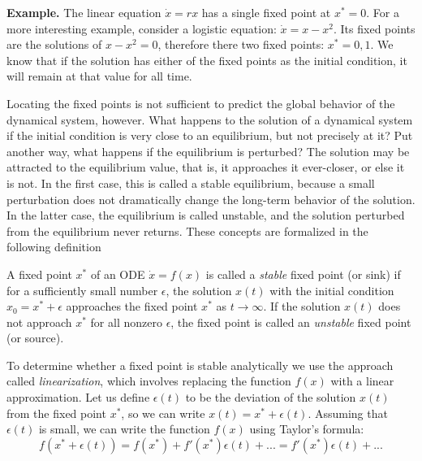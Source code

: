 \documentclass[
  letterpaper,
  DIV=11,
  numbers=noendperiod]{scrreprt}
\begin{document}
\textbf{Example.} The linear equation \(\dot x = rx\) has a single fixed
point at \(x^* = 0\). For a more interesting example, consider a
logistic equation: \(\dot x = x - x^2\). Its fixed points are the
solutions of \(x - x^2 = 0\), therefore there two fixed points:
\(x^* = 0, 1\). We know that if the solution has either of the fixed
points as the initial condition, it will remain at that value for all
time.

Locating the fixed points is not sufficient to predict the global
behavior of the dynamical system, however. What happens to the solution
of a dynamical system if the initial condition is very close to an
equilibrium, but not precisely at it? Put another way, what happens if
the equilibrium is perturbed? The solution may be attracted to the
equilibrium value, that is, it approaches it ever-closer, or else it is
not. In the first case, this is called a stable equilibrium, because a
small perturbation does not dramatically change the long-term behavior
of the solution. In the latter case, the equilibrium is called unstable,
and the solution perturbed from the equilibrium never returns. These
concepts are formalized in the following definition

\begin{tcolorbox}[enhanced jigsaw, coltitle=black, arc=.35mm, opacitybacktitle=0.6, breakable, bottomtitle=1mm, toptitle=1mm, titlerule=0mm, colback=white, leftrule=.75mm, rightrule=.15mm, colframe=quarto-callout-note-color-frame, colbacktitle=quarto-callout-note-color!10!white, opacityback=0, title=\textcolor{quarto-callout-note-color}{\faInfo}\hspace{0.5em}{Definition}, left=2mm, toprule=.15mm, bottomrule=.15mm]

A fixed point \(x^*\) of an ODE \(\dot x = f(x)\) is called a
\emph{stable} fixed point (or sink) if for a sufficiently small number
\(\epsilon\), the solution \(x(t)\) with the initial condition
\(x_0 = x^* + \epsilon\) approaches the fixed point \(x^*\) as
\(t \rightarrow \infty\). If the solution \(x(t)\) does not approach
\(x^*\) for all nonzero \(\epsilon\), the fixed point is called an
\emph{unstable} fixed point (or source).

\end{tcolorbox}

To determine whether a fixed point is stable analytically we use the
approach called
\emph{linearization}, which involves replacing the function \(f(x)\)
with a linear approximation. Let us define \(\epsilon(t)\) to be the
deviation of the solution \(x(t)\) from the fixed point \(x^*\), so we
can write \(x(t) = x^* + \epsilon(t)\). Assuming that \(\epsilon(t)\) is
small, we can write the function \(f(x)\) using Taylor's formula:
\[ f(x^*+\epsilon(t))= f(x^*)+f'(x^*) \epsilon(t) + ... = f'(x^*) \epsilon(t) + ... \]
\end{document}
